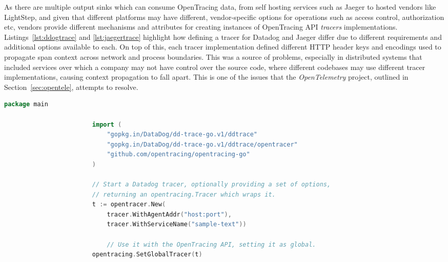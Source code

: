 \documentclass[12pt,pdftex,titlepage]{report}
\begin{document}
                As there are multiple output sinks which can consume OpenTracing data, from self hosting services such as Jaeger to hosted vendors like LightStep, and given that
                different platforms may have different, vendor-specific options for operations such as access control, authorization etc, vendors provide different mechanisms
                and attributes for creating instances of OpenTracing API \textit{tracers} implementations. Listings~{\ref{lst:ddogtrace}} and {\ref{lst:jaegertrace}} highlight how defining a tracer
                for Datadog and Jaeger differ due to different requirements and additional options available to each. On top of this, each tracer implementation defined different HTTP header 
                keys and encodings used to propagate span context across network and process boundaries. This was a source of problems, especially in distributed systems
                that included services over which a company may not have control over the source code, where different codebases may use different tracer implementations, causing context
                propagation to fall apart. This is one of the issues that the \textit{OpenTelemetry} project, outlined in Section~{\ref{sec:opentele}}, attempts to resolve.

                \begin{spacing}{1.0}
                    \begin{lstlisting}[caption=Example Go language snippet of instatiating a Datadog OpenTracing compatible tracer., language=Go, gobble=24, label={lst:ddogtrace}]
                        package main

                        import (
                            "gopkg.in/DataDog/dd-trace-go.v1/ddtrace"
                            "gopkg.in/DataDog/dd-trace-go.v1/ddtrace/opentracer"
                            "github.com/opentracing/opentracing-go"
                        )

                        // Start a Datadog tracer, optionally providing a set of options,
                        // returning an opentracing.Tracer which wraps it.
                        t := opentracer.New(
                            tracer.WithAgentAddr("host:port"),
                            tracer.WithServiceName("sample-text"))

                            // Use it with the OpenTracing API, setting it as global.
                        opentracing.SetGlobalTracer(t)
                    \end{lstlisting}
                \end{spacing}
\end{document}

